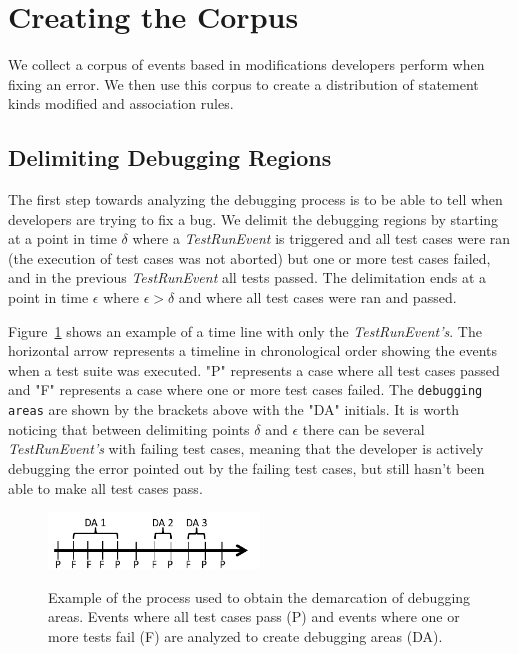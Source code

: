 \documentclass[sigconf]{acmart}
\begin{document}
\section{Creating the Corpus}
We collect a corpus of events based in modifications 
developers perform when fixing an error. We then
use this corpus to create a distribution of statement
kinds modified and association rules.

\subsection{Delimiting Debugging Regions}
\label{delimitDebugRegions}


The first step towards analyzing the debugging
process is to be able to tell when
developers are trying to fix a bug.
We delimit the debugging regions by starting at a point
in time $\delta$ where a \textit{TestRunEvent} is triggered and 
all test cases were ran (the execution of test cases
was not aborted) but one or more test cases failed, and in the 
previous \textit{TestRunEvent} all tests passed.
The delimitation ends at a point in time $\epsilon $ where $ \epsilon > \delta$ 
and where all test cases were ran and passed.

Figure~\ref{demarcations} shows an example of a time line
with only the \textit{TestRunEvent's}. The 
horizontal arrow represents a timeline in chronological order showing
the events when a test suite was executed. "P" represents a case
where all test cases passed and "F" represents a case where one
or more test cases failed. The \texttt{debugging areas} are shown by
the brackets above with the "DA" initials. 
It is worth noticing
that between delimiting points $\delta$ and $\epsilon$ there can be 
several \textit{TestRunEvent's} with failing test cases, meaning
that the developer is actively debugging the error pointed out
by the failing test cases, but still hasn't been able to make
all test cases pass.

\begin{figure}[h]
\caption{Example of the process used to obtain the demarcation of
debugging areas. Events where all test cases pass (P) and
events where one or more tests fail (F) are analyzed to create
debugging areas (DA).}
\centering
\includegraphics[width=0.5\textwidth]{images/demarcations.png}
\label{demarcations}
\end{figure}
\end{document}
